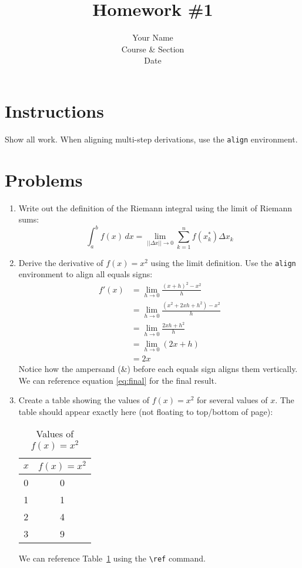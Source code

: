 \documentclass[11pt]{article}
\title{Homework \#1}
\author{Your Name \\ Course \& Section \\ Date}
\date{}
\begin{document}
\maketitle

\section*{Instructions}
Show all work. When aligning multi-step derivations, use the \texttt{align} environment.

\section*{Problems}
\begin{enumerate}
  \item Write out the definition of the Riemann integral using the limit of Riemann sums:
  \[
  \int_{a}^{b} f(x) \, dx = \lim_{||\Delta x|| \to 0} \sum_{k=1}^{n} f(x_k^*) \Delta x_k
  \]
  
  \item Derive the derivative of $f(x)=x^2$ using the limit definition. Use the \texttt{align} environment to align all equals signs:
\begin{align}
  f'(x) &= \lim_{h \to 0} \frac{(x+h)^2 - x^2}{h} \label{eq:step1} \\
        &= \lim_{h \to 0} \frac{(x^2 + 2xh + h^2) - x^2}{h} \label{eq:step2} \\
        &= \lim_{h \to 0} \frac{2xh + h^2}{h} \label{eq:step3} \\
        &= \lim_{h \to 0} (2x + h) \label{eq:step4} \\
        &= 2x \label{eq:final}
\end{align}
  Notice how the ampersand (\&) before each equals sign aligns them vertically. We can reference equation \ref{eq:final} for the final result.
  
  \item Create a table showing the values of $f(x) = x^2$ for several values of $x$. The table should appear exactly here (not floating to top/bottom of page):
  \begin{table}[h]
    \centering
    \begin{tabular}{|c|c|}
      \hline
      $x$ & $f(x) = x^2$ \\
      \hline
      0 & 0 \\
      1 & 1 \\
      2 & 4 \\
      3 & 9 \\
      \hline
    \end{tabular}
    \caption{Values of $f(x) = x^2$}
    \label{tab:squares}
  \end{table}
  We can reference Table~\ref{tab:squares} using the \verb|\ref| command.
  

\end{enumerate}
\end{document}
